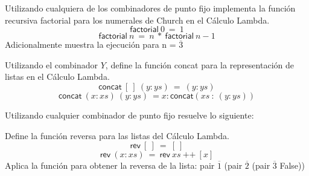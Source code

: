                 \begin{exercise}
                    Utilizando cualquiera de los combinadores de punto fijo implementa la función recursiva \textsf{factorial} para los numerales de Church en el Cálculo Lambda.
                    \[ \textsf{factorial}\ 0\ =\ 1 \]
                    \[ \textsf{factorial}\ n\ =\ n\ *\ \textsf{factorial}\ n-1\]
                    Adicionalmente muestra la ejecución para n = $\overline{3}$
                \end{exercise}






                \begin{exercise}
                    Utilizando el combinador $Y$, define la función \textsf{concat} para la representación de listas en el Cálculo Lambda.
                    \[
                        \textsf{concat}\ [\ ]\ (y:ys)\ =\ (y:ys)
                    \]
                    \[
                        \textsf{concat}\ (x:xs)\ (y:ys)\ = x:\textsf{concat}(xs\ :\ (y:ys))
                    \]
                \end{exercise}



                \begin{exercise}
                    Utilizando cualquier combinador de punto fijo resuelve lo siguiente:
                    
                    Define la función reversa para las listas del Cálculo Lambda.
                    \[
                        \textsf{rev}\ [\ ]\ =\ [\ ]
                    \]
                    \[
                        \textsf{rev}\ (x:xs)\ =\ \textsf{rev}\ xs\ \text{++}\ [x]
                    \]
                    Aplica la función para obtener la reversa de la lista: \textsf{pair $\overline{1}$ (pair $\overline{2}$ (pair $\overline{3}$ False))}
                \end{exercise}



